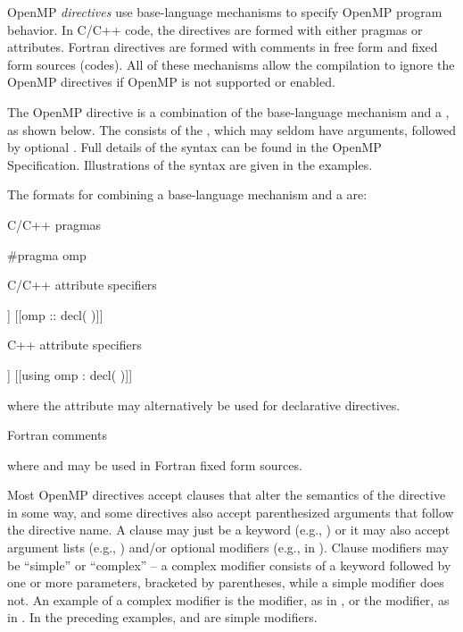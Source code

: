 \label{chap:directive_syntax}

OpenMP \emph{directives} use base-language mechanisms to specify OpenMP program behavior.
In C/C++ code, the directives are formed with 
either pragmas or attributes.
Fortran directives are formed with comments in free form and fixed form sources (codes).
All of these mechanisms allow the compilation to ignore the OpenMP directives if
OpenMP is not supported or enabled.


The OpenMP directive is a combination of the base-language mechanism and a ,
as shown below. The  consists
of the , which may seldom have arguments, 
followed by optional . Full details of the syntax can be found in the OpenMP Specification.
Illustrations of the syntax are given in the examples.

The formats for combining a base-language mechanism and a  are:

C/C++ pragmas
\begin{indentedcodelist}
#pragma omp 
\end{indentedcodelist}

C/C++ attribute specifiers
\begin{indentedcodelist}
[[omp :: directive( \plc{directive-specification} )]]
[[omp :: decl(  )]]
\end{indentedcodelist}

C++ attribute specifiers
\begin{indentedcodelist}
[[using omp : directive( \plc{directive-specification} )]]
[[using omp : decl(  )]]
\end{indentedcodelist}

where the  attribute may alternatively be used for declarative
directives.

Fortran comments

where  and  may be used in Fortran fixed form sources.

Most OpenMP directives accept clauses that alter the semantics of the directive in some way, 
and some directives also accept parenthesized arguments that follow the directive name. 
A clause may just be a keyword (e.g., ) or it may also accept argument lists 
(e.g., ) and/or optional modifiers (e.g.,  in 
).
Clause modifiers may be ``simple'' or ``complex'' -- a complex modifier consists of a
keyword followed by one or more parameters, bracketed by parentheses, while a simple 
modifier does not. An example of a complex modifier is the  modifier, 
as in , or the  modifier, as in 
. 
In the preceding examples,  and  are simple modifiers.

